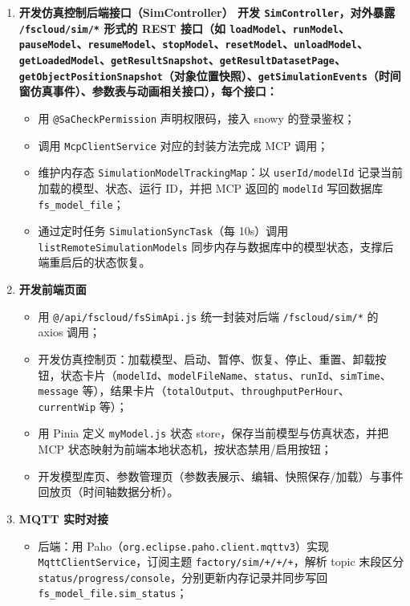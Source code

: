 \begin{enumerate}[label=\arabic*)]
\begin{itemize}
	\end{itemize}
	\item \bf{开发仿真控制后端接口（SimController）}\label{sec:brief-step5}
	开发 \texttt{SimController}，对外暴露 \texttt{/fscloud/sim/*} 形式的 REST 接口（如 \texttt{loadModel}、\texttt{runModel}、\texttt{pauseModel}、\texttt{resumeModel}、\texttt{stopModel}、\texttt{resetModel}、\texttt{unloadModel}、\texttt{getLoadedModel}、\texttt{getResultSnapshot}、\texttt{getResultDatasetPage}、\texttt{getObjectPositionSnapshot}（对象位置快照）、\texttt{getSimulationEvents}（时间窗仿真事件）、参数表与动画相关接口），每个接口：
	\begin{itemize}
		\item 用 \texttt{@SaCheckPermission} 声明权限码，接入 snowy 的登录鉴权；
		\item 调用 \texttt{McpClientService} 对应的封装方法完成 MCP 调用；
		\item 维护内存态 \texttt{SimulationModelTrackingMap}：以 \texttt{userId/modelId} 记录当前加载的模型、状态、运行 ID，并把 MCP 返回的 \texttt{modelId} 写回数据库 \texttt{fs\_model\_file}；
		\item 通过定时任务 \texttt{SimulationSyncTask}（每 10s）调用 \texttt{listRemoteSimulationModels} 同步内存与数据库中的模型状态，支撑后端重启后的状态恢复。
	\end{itemize}
	\item \bf{开发前端页面}\label{sec:brief-step6}
	\begin{itemize}
		\item 用 \texttt{@/api/fscloud/fsSimApi.js} 统一封装对后端 \texttt{/fscloud/sim/*} 的 axios 调用；
		\item 开发仿真控制页：加载模型、启动、暂停、恢复、停止、重置、卸载按钮，状态卡片（\texttt{modelId}、\texttt{modelFileName}、\texttt{status}、\texttt{runId}、\texttt{simTime}、\texttt{message} 等），结果卡片（\texttt{totalOutput}、\texttt{throughputPerHour}、\texttt{currentWip} 等）；
		\item 用 Pinia 定义 \texttt{myModel.js} 状态 store，保存当前模型与仿真状态，并把 MCP 状态映射为前端本地状态机，按状态禁用/启用按钮；
		\item 开发模型库页、参数管理页（参数表展示、编辑、快照保存/加载）与事件回放页（时间轴数据分析）。
	\end{itemize}
	\item \bf{MQTT 实时对接}\label{sec:brief-step7}
	\begin{itemize}
		\item 后端：用 Paho（\texttt{org.eclipse.paho.client.mqttv3}）实现 \texttt{MqttClientService}，订阅主题 \texttt{factory/sim/+/+/+}，解析 topic 末段区分 \texttt{status/progress/console}，分别更新内存记录并同步写回 \texttt{fs\_model\_file.sim\_status}；

\end{itemize}
\end{enumerate}
